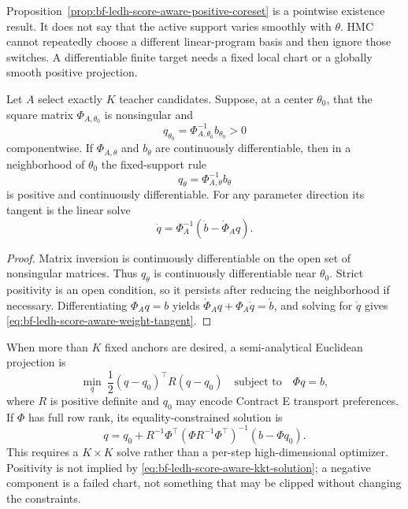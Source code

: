 Proposition~\ref{prop:bf-ledh-score-aware-positive-coreset} is a pointwise
existence result.  It does not say that the active support varies smoothly with
\(\theta\).  HMC cannot repeatedly choose a different linear-program basis and
then ignore those switches.  A differentiable finite target needs a fixed local
chart or a globally smooth positive projection.

\begin{proposition}
\label{prop:bf-ledh-score-aware-fixed-chart}
Let \(A\) select exactly \(K\) teacher candidates.  Suppose, at a center
\(\theta_0\), that the square matrix \(\Phi_{A,\theta_0}\) is nonsingular and
\[
  q_{\theta_0}=\Phi_{A,\theta_0}^{-1}b_{\theta_0}>0
\]
componentwise.  If \(\Phi_{A,\theta}\) and \(b_\theta\) are continuously
differentiable, then in a neighborhood of \(\theta_0\) the fixed-support rule
\begin{equation}
\label{eq:bf-ledh-score-aware-square-solve}
  q_\theta=\Phi_{A,\theta}^{-1}b_\theta
\end{equation}
is positive and continuously differentiable.  For any parameter direction its
tangent is the linear solve
\begin{equation}
\label{eq:bf-ledh-score-aware-weight-tangent}
  \dot q
  =\Phi_A^{-1}\left(\dot b-\dot\Phi_A q\right).
\end{equation}
\end{proposition}

\begin{proof}
Matrix inversion is continuously differentiable on the open set of nonsingular
matrices.  Thus \(q_\theta\) is continuously differentiable near \(\theta_0\).
Strict positivity is an open condition, so it persists after reducing the
neighborhood if necessary.  Differentiating
\(\Phi_Aq=b\) yields
\(\dot\Phi_Aq+\Phi_A\dot q=\dot b\), and solving for \(\dot q\) gives
\eqref{eq:bf-ledh-score-aware-weight-tangent}.
\end{proof}

When more than \(K\) fixed anchors are desired, a semi-analytical Euclidean
projection is
\begin{equation}
\label{eq:bf-ledh-score-aware-kkt-problem}
  \min_q\ \frac12(q-q_0)^\top R(q-q_0)
  \quad\text{subject to}\quad \Phi q=b,
\end{equation}
where \(R\) is positive definite and \(q_0\) may encode Contract E transport
preferences.  If \(\Phi\) has full row rank, its equality-constrained solution is
\begin{equation}
\label{eq:bf-ledh-score-aware-kkt-solution}
  q=q_0+R^{-1}\Phi^\top
  (\Phi R^{-1}\Phi^\top)^{-1}(b-\Phi q_0).
\end{equation}
This requires a \(K\times K\) solve rather than a per-step high-dimensional
optimizer.  Positivity is not implied by
\eqref{eq:bf-ledh-score-aware-kkt-solution}; a negative component is a failed
chart, not something that may be clipped without changing the constraints.

